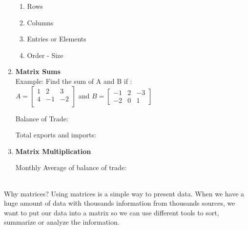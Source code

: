 \documentclass[12pt]{amsart}
\begin{document}
\begin{enumerate}
\begin{enumerate}
			\item Rows 
			
			\item Columns 
			
			\item Entries or Elements 
			
			\item Order - Size 
			
		\end{enumerate}
	
	\item \textbf{Matrix Sums} \\
	
		Example: Find the sum of A and B if : \\
		
		$ A = \begin{bmatrix}
		1 & 2 & 3 \\
		4 & -1 & -2 \\
		
		\end{bmatrix} $ and $B = \begin{bmatrix}     
		                                 
		                                 	-1 & 2 & -3 \\
						-2 & 0 & 1 
		                                 
		                                          \end{bmatrix}$ \\
		\vspace{2in}
		
		Balance of Trade: \\
		\vspace{2in}
		
		Total exports and imports: \\
		\vspace{2in}
			
	\item \textbf{Matrix Multiplication}
	
		Monthly Average of balance of trade: \\

	\vspace{2in}
	
	
		

\end{enumerate}
 \\

Why matrices?  Using matrices is a simple way to present data. When we have a huge amount of data with thousands information from thousands sources, we want to put our data into a matrix so we can use different tools to sort, summarize or analyze the information.    \\	
\end{document}
